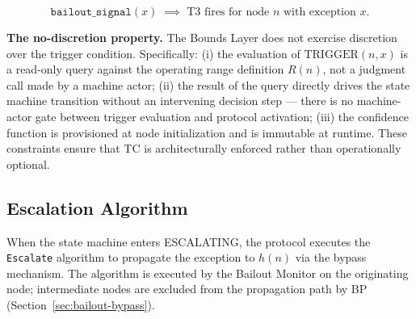 \begin{equation}
\texttt{bailout\_signal}(x) \;\implies\; \text{T3 fires for node } n \text{ with exception } x. \tag{TC-secondary}
\end{equation}

\bigskip
\noindent\textbf{The no-discretion property.} The Bounds Layer does not exercise discretion over the trigger condition. Specifically: (i) the evaluation of $\text{TRIGGER}(n, x)$ is a read-only query against the operating range definition $R(n)$, not a judgment call made by a machine actor; (ii) the result of the query directly drives the state machine transition without an intervening decision step --- there is no machine-actor gate between trigger evaluation and protocol activation; (iii) the confidence function is provisioned at node initialization and is immutable at runtime. These constraints ensure that TC is architecturally enforced rather than operationally optional.

\subsection{Escalation Algorithm}
\label{sec:bailout-escalation}

When the state machine enters ESCALATING, the protocol executes the \texttt{Escalate} algorithm to propagate the exception to $h(n)$ via the bypass mechanism. The algorithm is executed by the Bailout Monitor on the originating node; intermediate nodes are excluded from the propagation path by BP (Section~\ref{sec:bailout-bypass}).

